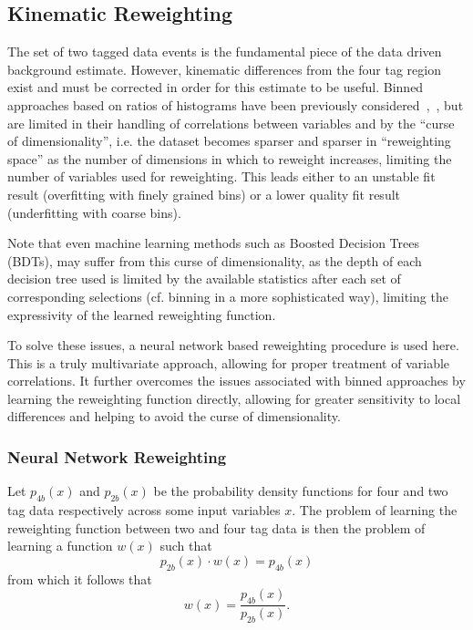 \subsection{Kinematic Reweighting}
The set of two tagged data events is the fundamental piece of the data driven
background estimate. However, kinematic differences from the four tag region
exist and must be corrected in order for this estimate to be useful. Binned 
approaches based on ratios of histograms have been previously considered~\cite{EXOT-2016-31},~\cite{HDBS-2018-18}, 
but are limited in their handling of correlations 
between variables and by the ``curse of dimensionality'', i.e. the dataset
becomes sparser and sparser in ``reweighting space'' as the number of dimensions
in which to reweight increases, limiting the number of variables used for reweighting. 
This leads either to an unstable fit result (overfitting with finely grained bins) or a 
lower quality fit result (underfitting with coarse bins).

Note that even machine learning methods such as Boosted Decision Trees (BDTs), may suffer
from this curse of dimensionality, as the depth of each decision tree used is limited by 
the available statistics after each set of corresponding selections (cf. binning in a 
more sophisticated way), limiting the expressivity of the learned reweighting function.

To solve these issues, a neural network based reweighting procedure is used
here. This is a truly multivariate approach, allowing for proper treatment of
variable correlations. It further overcomes the issues associated with binned
approaches by learning the reweighting function directly, allowing for greater
sensitivity to local differences and helping to avoid the curse of
dimensionality.


\subsubsection{Neural Network Reweighting}
Let $p_{4b}(x)$ and $p_{2b}(x)$ be the probability density functions for four and two tag data respectively across some input variables $x$. 
The problem of learning the reweighting function between two and four tag data is then the problem of learning a function $w(x)$ such that
\begin{equation}
p_{2b}(x) \cdot w(x) = p_{4b}(x)
\end{equation}
from which it follows that
\begin{equation}
w(x) = \frac{p_{4b}(x)}{p_{2b}(x)}.
\end{equation}

